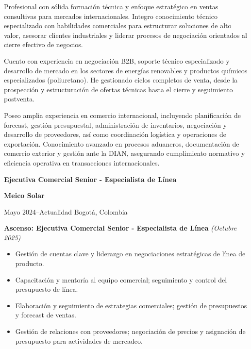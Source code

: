 \documentclass[10pt,a4paper]{altacv}
\renewcommand{\cvevent}[4]{%
  {\large\bfseries\color{emphasis}#1\par}
  \smallskip
  \textbf{\color{accent}#2}\par
  \smallskip
  {\small\faCalendar \hspace{0.5em}#3\hspace{2em}%
  \ifstrequal{#4}{}{}{\faMapMarker\hspace{0.5em}#4}\par}
  \medskip
}
\begin{document}

\makecvheader

{\small\justifying
Profesional con sólida formación técnica y enfoque estratégico en ventas consultivas para mercados internacionales. Integro conocimiento técnico especializado con habilidades comerciales para estructurar soluciones de alto valor, asesorar clientes industriales y liderar procesos de negociación orientados al cierre efectivo de negocios.

Cuento con experiencia en negociación B2B, soporte técnico especializado y desarrollo de mercado en los sectores de energías renovables y productos químicos especializados (poliuretano). He gestionado ciclos completos de venta, desde la prospección y estructuración de ofertas técnicas hasta el cierre y seguimiento postventa.

Poseo amplia experiencia en comercio internacional, incluyendo planificación de forecast, gestión presupuestal, administración de inventarios, negociación y desarrollo de proveedores, así como coordinación logística y operaciones de exportación. Conocimiento avanzado en procesos aduaneros, documentación de comercio exterior y gestión ante la DIAN, asegurando cumplimiento normativo y eficiencia operativa en transacciones internacionales.
\par}

\cvevent{Ejecutiva Comercial Senior - Especialista de Línea}{Meico Solar}{Mayo 2024--Actualidad}{Bogotá, Colombia}
{\color{accent}\textbf{Ascenso: Ejecutiva Comercial Senior - Especialista de Línea}} {\small\textit{(Octubre 2025)}}
\begin{itemize}
\item Gestión de cuentas clave y liderazgo en negociaciones estratégicas de línea de producto.
\item Capacitación y mentoría al equipo comercial; seguimiento y control del presupuesto de línea.
\item Elaboración y seguimiento de estrategias comerciales; gestión de presupuestos y forecast de ventas.
\item Gestión de relaciones con proveedores; negociación de precios y asignación de presupuesto para actividades de mercadeo.
\end{itemize}
\end{document}
